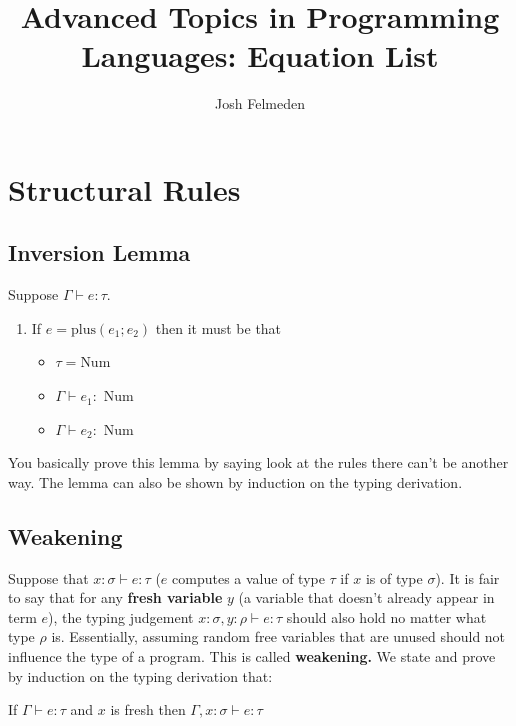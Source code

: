 \documentclass[11pt,a4paper,titlepage,dvipsnames,cmyk]{scrartcl}
\title{Advanced Topics in Programming Languages: Equation List}
\author{Josh Felmeden}
\begin{document}
\maketitle
\tableofcontents
\newpage

\section{Structural Rules}
\subsection{Inversion Lemma}

\begin{tcolorbox} [space to upper,
collower=white,
title={Lemma 1 (Inversion)},
nobeforeafter,
halign lower=flush right, ]
Suppose $\Gamma \vdash e : \tau$.
\begin{enumerate}
\item If $e=\text{plus}(e_1;e_2)$ then it must be that
\begin{itemize}
    \item $\tau = \text{Num}$
    \item $\Gamma \vdash e_1 : \text{ Num}$
    \item $\Gamma \vdash e_2 : \text{ Num}$
\end{itemize}
\end{enumerate}
\end{tcolorbox}

You basically prove this lemma by saying look at the rules there can't be another way. The lemma can also be shown by induction on the typing derivation.

\subsection{Weakening}
Suppose that $x : \sigma \vdash e: \tau$ ($e$ computes a value of type $\tau$ if $x$ is of type $\sigma$). It is fair to say that for any \textbf{fresh variable} $y$ (a variable that doesn't already appear in term $e$), the typing judgement $x: \sigma, y:\rho \vdash e:\tau$ should also hold no matter what type $\rho$ is. Essentially, assuming random free variables that are unused should not influence the type of a program. This is called \textbf{weakening.} We state and prove by induction on the typing derivation that:

\begin{tcolorbox} [space to upper,
collower=white,
title={Lemma 2 (Weakening)},
nobeforeafter,
halign lower=flush right, ]
If $\Gamma \vdash e:  \tau$ and $x$ is fresh then $\Gamma, x : \sigma \vdash e : \tau$
\end{tcolorbox}
\end{document}
